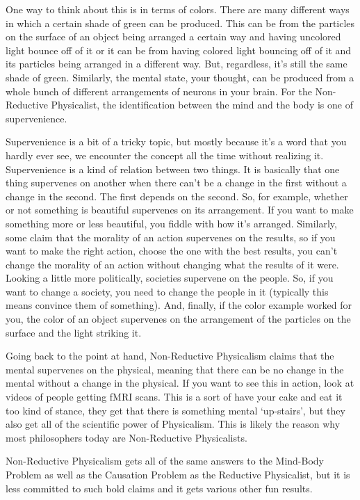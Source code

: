 One way to think about this is in terms of colors. There are many different ways in which a certain shade of green can be produced. This can be from the particles on the surface of an object being arranged a certain way and having uncolored light bounce off of it or it can be from having colored light bouncing off of it and its particles being arranged in a different way. But, regardless, it's still the same shade of green. Similarly, the mental state, your thought, can be produced from a whole bunch of different arrangements of neurons in your brain. For the Non-Reductive Physicalist, the identification between the mind and the body is one of supervenience. 

Supervenience is a bit of a tricky topic, but mostly because it's a word that you hardly ever see, we encounter the concept all the time without realizing it. Supervenience is a kind of relation between two things. It is basically that one thing supervenes on another when there can’t be a change in the first without a change in the second. The first depends on the second. So, for example, whether or not something is beautiful supervenes on its arrangement. If you want to make something more or less beautiful, you fiddle with how it's arranged. Similarly, some claim that the morality of an action supervenes on the results, so if you want to make the right action, choose the one with the best results, you can't change the morality of an action without changing what the results of it were. Looking a little more politically, societies supervene on the people. So, if you want to change a society, you need to change the people in it (typically this means convince them of something). And, finally, if the color example worked for you, the color of an object supervenes on the arrangement of the particles on the surface and the light striking it. 

Going back to the point at hand, Non-Reductive Physicalism claims that the mental supervenes on the physical, meaning that there can be no change in the mental without a change in the physical. If you want to see this in action, look at videos of people getting fMRI scans. This is a sort of have your cake and eat it too kind of stance, they get that there is something mental `up-stairs', but they also get all of the scientific power of Physicalism. This is likely the reason why most philosophers today are Non-Reductive Physicalists. 

Non-Reductive Physicalism gets all of the same answers to the Mind-Body Problem as well as the Causation Problem as the Reductive Physicalist, but it is less committed to such bold claims and it gets various other fun results. 

